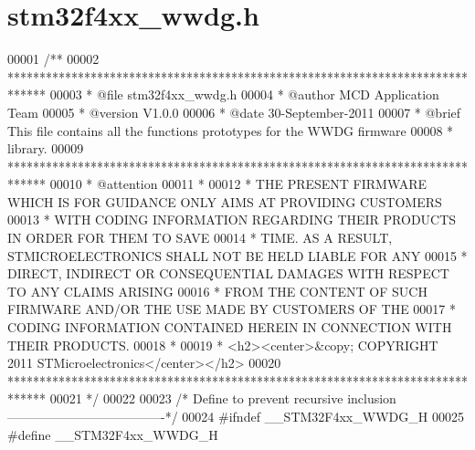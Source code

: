 \section{stm32f4xx\+\_\+wwdg.\+h}
\label{stm32f4xx__wwdg_8h_source}

\begin{DoxyCode}
00001 \textcolor{comment}{/**}
00002 \textcolor{comment}{  ******************************************************************************}
00003 \textcolor{comment}{  * @file    stm32f4xx\_wwdg.h}
00004 \textcolor{comment}{  * @author  MCD Application Team}
00005 \textcolor{comment}{  * @version V1.0.0}
00006 \textcolor{comment}{  * @date    30-September-2011}
00007 \textcolor{comment}{  * @brief   This file contains all the functions prototypes for the WWDG firmware}
00008 \textcolor{comment}{  *          library.}
00009 \textcolor{comment}{  ******************************************************************************}
00010 \textcolor{comment}{  * @attention}
00011 \textcolor{comment}{  *}
00012 \textcolor{comment}{  * THE PRESENT FIRMWARE WHICH IS FOR GUIDANCE ONLY AIMS AT PROVIDING CUSTOMERS}
00013 \textcolor{comment}{  * WITH CODING INFORMATION REGARDING THEIR PRODUCTS IN ORDER FOR THEM TO SAVE}
00014 \textcolor{comment}{  * TIME. AS A RESULT, STMICROELECTRONICS SHALL NOT BE HELD LIABLE FOR ANY}
00015 \textcolor{comment}{  * DIRECT, INDIRECT OR CONSEQUENTIAL DAMAGES WITH RESPECT TO ANY CLAIMS ARISING}
00016 \textcolor{comment}{  * FROM THE CONTENT OF SUCH FIRMWARE AND/OR THE USE MADE BY CUSTOMERS OF THE}
00017 \textcolor{comment}{  * CODING INFORMATION CONTAINED HEREIN IN CONNECTION WITH THEIR PRODUCTS.}
00018 \textcolor{comment}{  *}
00019 \textcolor{comment}{  * <h2><center>&copy; COPYRIGHT 2011 STMicroelectronics</center></h2>}
00020 \textcolor{comment}{  ******************************************************************************}
00021 \textcolor{comment}{  */}
00022 
00023 \textcolor{comment}{/* Define to prevent recursive inclusion -------------------------------------*/}
00024 \textcolor{preprocessor}{#}\textcolor{preprocessor}{ifndef} \textcolor{preprocessor}{\_\_STM32F4xx\_WWDG\_H}
00025 \textcolor{preprocessor}{#}\textcolor{preprocessor}{define} \textcolor{preprocessor}{\_\_STM32F4xx\_WWDG\_H}

\end{DoxyCode}
